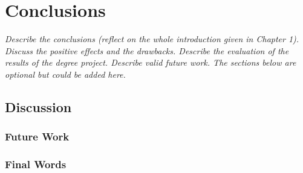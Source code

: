 \chapter{Conclusions}
\label{chap6}

\textit{Describe the conclusions (reflect on the whole introduction given in Chapter 1). Discuss the positive effects and the drawbacks. Describe the evaluation of the results of the degree project. Describe valid future work. The sections below are optional but could be added here.}

\section{Discussion}

\subsection{Future Work}

\subsection{Final Words}







